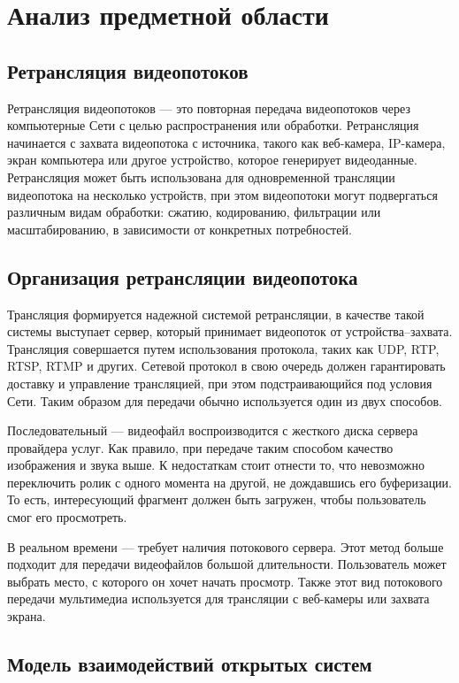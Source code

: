 \chapter{Анализ предметной области}

\section{Ретрансляция видеопотоков}

Ретрансляция видеопотоков --- это повторная передача видеопотоков через компьютерные Сети с целью распространения или обработки.
Ретрансляция начинается с захвата видеопотока с источника, такого как веб-камера, IP-камера, экран компьютера или другое устройство, которое генерирует видеоданные.
Ретрансляция может быть использована для одновременной трансляции видеопотока на несколько устройств, при этом видеопотоки могут подвергаться различным видам обработки: сжатию, кодированию, фильтрации или масштабированию, в зависимости от конкретных потребностей.

\section{Организация ретрансляции видеопотока}

Трансляция формируется надежной системой ретрансляции, в качестве такой системы выступает сервер, который принимает видеопоток от устройства--захвата. Трансляция совершается путем использования протокола, таких как UDP, RTP, RTSP, RTMP и других.
Сетевой протокол в свою очередь должен гарантировать доставку и управление трансляцией, при этом подстраивающийся под условия Сети. Таким образом для передачи  обычно используется один из двух способов.

Последовательный --- видеофайл воспроизводится с жесткого диска сервера провайдера услуг. Как правило, при передаче таким способом качество изображения и звука выше. К недостаткам стоит отнести то, что невозможно переключить ролик с одного момента на другой, не дождавшись его буферизации. То есть, интересующий фрагмент должен быть загружен, чтобы пользователь смог его просмотреть.

В реальном времени --- требует наличия потокового сервера. Этот метод больше подходит для передачи видеофайлов большой длительности. Пользователь может выбрать место, с которого он хочет начать просмотр. Также этот вид потокового передачи мультимедиа используется для трансляции с веб-камеры или захвата экрана.

\section{Модель взаимодействий открытых систем}

